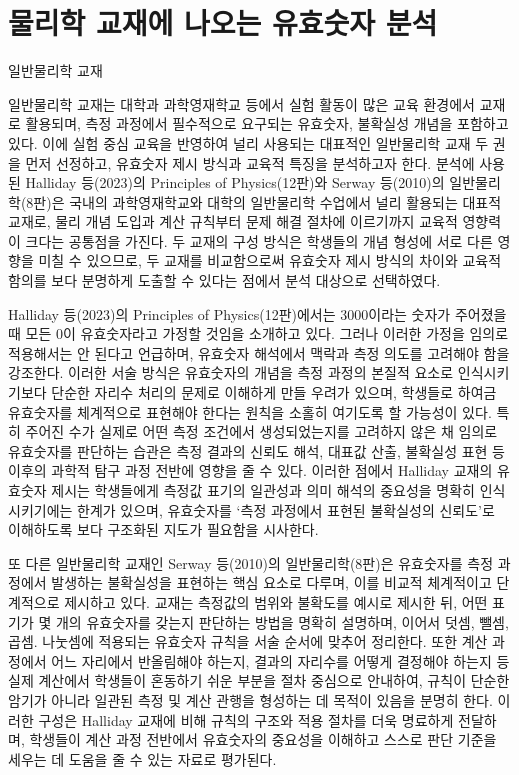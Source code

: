 \section{물리학 교재에 나오는 유효숫자 분석}
\ganadareset

\ganada 일반물리학 교재

일반물리학 교재는 대학과 과학영재학교 등에서 실험 활동이 많은 교육 환경에서 교재로 활용되며,
측정 과정에서 필수적으로 요구되는 유효숫자, 불확실성 개념을 포함하고 있다.
%
이에 실험 중심 교육을 반영하여 널리 사용되는 대표적인 일반물리학 교재 두 권을 먼저 선정하고,
유효숫자 제시 방식과 교육적 특징을 분석하고자 한다.
%
분석에 사용된 Halliday 등(2023)의 Principles of Physics(12판)와
Serway 등(2010)의 일반물리학(8판)은 국내의 과학영재학교와 대학의 일반물리학 수업에서
널리 활용되는 대표적 교재로, 물리 개념 도입과 계산 규칙부터 문제 해결 절차에 이르기까지
교육적 영향력이 크다는 공통점을 가진다.
%
두 교재의 구성 방식은 학생들의 개념 형성에 서로 다른 영향을 미칠 수 있으므로,
두 교재를 비교함으로써 유효숫자 제시 방식의 차이와 교육적 함의를 보다 분명하게 도출할 수 있다는
점에서 분석 대상으로 선택하였다.

Halliday 등(2023)의 Principles of Physics(12판)에서는
3000이라는 숫자가 주어졌을 때 모든 0이 유효숫자라고 가정할 것임을 소개하고 있다.
%
그러나 이러한 가정을 임의로 적용해서는 안 된다고 언급하며,
유효숫자 해석에서 맥락과 측정 의도를 고려해야 함을 강조한다.
%
이러한 서술 방식은 유효숫자의 개념을 측정 과정의 본질적 요소로 인식시키기보다
단순한 자리수 처리의 문제로 이해하게 만들 우려가 있으며,
학생들로 하여금 유효숫자를 체계적으로 표현해야 한다는 원칙을 소홀히 여기도록 할 가능성이 있다.
%
특히 주어진 수가 실제로 어떤 측정 조건에서 생성되었는지를 고려하지 않은 채 임의로
유효숫자를 판단하는 습관은 측정 결과의 신뢰도 해석, 대표값 산출, 불확실성 표현 등
이후의 과학적 탐구 과정 전반에 영향을 줄 수 있다.
%
이러한 점에서 Halliday 교재의 유효숫자 제시는 학생들에게 측정값 표기의 일관성과
의미 해석의 중요성을 명확히 인식시키기에는 한계가 있으며,
유효숫자를 `측정 과정에서 표현된 불확실성의 신뢰도'로 이해하도록 보다 구조화된 지도가 필요함을 시사한다.

또 다른 일반물리학 교재인 Serway 등(2010)의 일반물리학(8판)은 유효숫자를 측정 과정에서 발생하는 불확실성을
표현하는 핵심 요소로 다루며, 이를 비교적 체계적이고 단계적으로 제시하고 있다.
%
교재는 측정값의 범위와 불확도를 예시로 제시한 뒤, 어떤 표기가 몇 개의 유효숫자를 갖는지 판단하는 방법을
명확히 설명하며, 이어서 덧셈, 뺄셈, 곱셈. 나눗셈에 적용되는 유효숫자 규칙을 서술 순서에 맞추어 정리한다.
%
또한 계산 과정에서 어느 자리에서 반올림해야 하는지, 결과의 자리수를 어떻게 결정해야 하는지 등
실제 계산에서 학생들이 혼동하기 쉬운 부분을 절차 중심으로 안내하여,
규칙이 단순한 암기가 아니라 일관된 측정 및 계산 관행을 형성하는 데 목적이 있음을 분명히 한다.
%
이러한 구성은 Halliday 교재에 비해 규칙의 구조와 적용 절차를 더욱 명료하게 전달하며,
학생들이 계산 과정 전반에서 유효숫자의 중요성을 이해하고 스스로 판단 기준을 세우는 데
도움을 줄 수 있는 자료로 평가된다. \\

